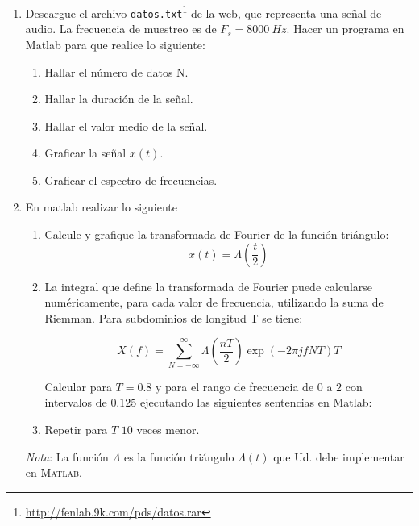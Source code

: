 \documentclass[a4paper,11pt,final]{article}
\begin{document}
\begin{enumerate}
    \item Descargue el archivo \texttt{datos.txt}\footnote{\url{http://fenlab.9k.com/pds/datos.rar}} de la web, que representa una señal de audio.
      La frecuencia de muestreo es de $F_s = 8000\ Hz$. Hacer un programa en Matlab para que realice
      lo siguiente:

      \begin{enumerate}
        \item Hallar el número de datos N.
        \item Hallar la duración de la señal.
        \item Hallar el valor medio de la señal.
        \item Graficar la señal $x\left(t\right)$.
        \item Graficar el espectro de frecuencias.
      \end{enumerate}

    \item En matlab realizar lo siguiente
      \begin{enumerate}
        \item Calcule y grafique la transformada de Fourier de la función triángulo:
              $$x\left(t\right) = \Lambda\left(\frac{t}{2}\right)$$
        \item La integral que define la transformada de Fourier puede calcularse
          numéricamente, para cada valor de frecuencia, utilizando la suma de
          Riemman. Para subdominios de longitud T se tiene:

          $$X\left(f\right)=\sum_{N=-\infty}^{\infty}\Lambda\left(\frac{n T}{2}\right)\exp(-2\pi j f N T )T$$

          Calcular para $T=0.8$ y para el rango de frecuencia de $0$ a $2$ con
          intervalos de $0.125$ ejecutando las siguientes sentencias en Matlab:

          \vspace{-1.5em}

        \item Repetir para $T$ $10$ veces menor.
      \end{enumerate}

      \emph{Nota}: La función $\Lambda$ es la función triángulo
      $\Lambda\left(t\right)$ que Ud. debe implementar en \textsc{Matlab}.
  \end{enumerate}
\end{document}

